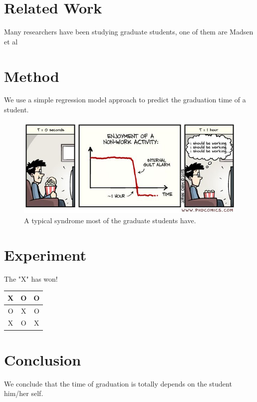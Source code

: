 \documentclass[12pt,a4paper]{report}
\begin{document}
\begin{CJK}{UTF8}{bsmi}
\chapter{Related Work}
    Many researchers have been studying graduate students, one of them are Madsen et al\citep{madsen1992successful}
 
\chapter{Method}
    We use a simple regression model approach to predict the graduation time of a student.
    \begin{figure}[H]
    
        \includegraphics[scale=0.65]{images/phd_comic.jpg}
        \caption{A typical syndrome most of the graduate students have.}
        \label{fig:phd_comic}
    \end{figure}
    


\chapter{Experiment}
The "X" has won!
    \begin{center}
        \begin{tabular}{ |c|c|c| } 
             \hline
             X & O & O \\ 
              \hline
             O & X & O \\ 
              \hline
             X & O & X \\ 
             \hline
        \end{tabular}
        \label{table:tic_tac_toe}
    \end{center}
 





\chapter{Conclusion}
    We conclude that the time of graduation is totally depends on the student him/her self. 

\end{CJK}



\end{document}
